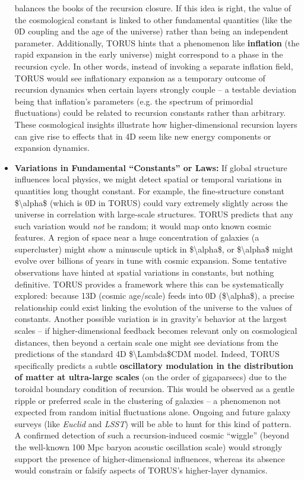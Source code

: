 \begin{itemize}
  balances the books of the recursion closure. If this idea is right,
  the value of the cosmological constant is linked to other fundamental
  quantities (like the 0D coupling and the age of the universe) rather
  than being an independent parameter. Additionally, TORUS hints that a
  phenomenon like \textbf{inflation} (the rapid expansion in the early
  universe) might correspond to a phase in the recursion cycle​. In
  other words, instead of invoking a separate inflation field, TORUS
  would see inflationary expansion as a temporary outcome of recursion
  dynamics when certain layers strongly couple -- a testable deviation
  being that inflation's parameters (e.g. the spectrum of primordial
  fluctuations) could be related to recursion constants rather than
  arbitrary. These cosmological insights illustrate how
  higher-dimensional recursion layers can give rise to effects that in
  4D seem like new energy components or expansion dynamics.
\item
  \textbf{Variations in Fundamental ``Constants'' or Laws:} If global
  structure influences local physics, we might detect spatial or
  temporal variations in quantities long thought constant. For example,
  the fine-structure constant \$\textbackslash{}alpha\$ (which is 0D in
  TORUS) could vary extremely slightly across the universe in
  correlation with large-scale structures. TORUS predicts that any such
  variation would \emph{not} be random; it would map onto known cosmic
  features​. A region of space near a huge concentration of galaxies (a
  supercluster) might show a minuscule uptick in
  \$\textbackslash{}alpha\$, or \$\textbackslash{}alpha\$ might evolve
  over billions of years in tune with cosmic expansion​. Some tentative
  observations have hinted at spatial variations in constants, but
  nothing definitive. TORUS provides a framework where this can be
  systematically explored: because 13D (cosmic age/scale) feeds into 0D
  (\$\textbackslash{}alpha\$), a precise relationship could exist
  linking the evolution of the universe to the values of constants.
  Another possible variation is in gravity's behavior at the largest
  scales -- if higher-dimensional feedback becomes relevant only on
  cosmological distances, then beyond a certain scale one might see
  deviations from the predictions of the standard 4D
  \$\textbackslash{}Lambda\$CDM model. Indeed, TORUS specifically
  predicts a subtle \textbf{oscillatory modulation in the distribution
  of matter at ultra-large scales} (on the order of gigaparsecs) due to
  the toroidal boundary condition of recursion​. This would be observed
  as a gentle ripple or preferred scale in the clustering of galaxies --
  a phenomenon not expected from random initial fluctuations alone.
  Ongoing and future galaxy surveys (like \emph{Euclid} and \emph{LSST})
  will be able to hunt for this kind of pattern​. A confirmed detection
  of such a recursion-induced cosmic ``wiggle'' (beyond the well-known
  100 Mpc baryon acoustic oscillation scale) would strongly support the
  presence of higher-dimensional influences, whereas its absence would
  constrain or falsify aspects of TORUS's higher-layer dynamics.
\end{itemize}

